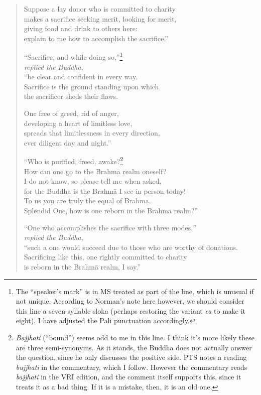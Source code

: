 \documentclass[12pt,openany]{book}%
\newcommand*{\scspeaker}[1]{\hspace{2em}\textit{#1}}
\begin{document}
\begin{verse}
Suppose a lay donor who is committed to charity \\
makes a sacrifice seeking merit, looking for merit, \\
giving food and drink to others here: \\
explain to me how to accomplish the sacrifice.” 

“Sacrifice, and while doing so,”\footnote{The “speaker’s mark” is in MS treated as part of the line, which is unusual if not unique. According to Norman’s note here however, we should consider this line a seven-syllable sloka (perhaps restoring the variant \textit{ca} to make it eight). I have adjusted the Pali punctuation accordingly. } \\
\scspeaker{replied the Buddha, }\\
“be clear and confident in every way. \\
Sacrifice is the ground standing upon which \\
the sacrificer sheds their flaws. 

One free of greed, rid of anger, \\
developing a heart of limitless love, \\
spreads that limitlessness in every direction, \\
ever diligent day and night.” 

“Who is purified, freed, awake?\footnote{\textit{Bajjhati} (“bound”) seems odd to me in this line. I think it’s more likely these are three semi-synonyms. As it stands, the Buddha does not actually answer the question, since he only discusses the positive side. PTS notes a reading \textit{bujjhati} in the commentary, which I follow. However the commentary reads \textit{bajjhati} in the VRI edition, and the comment itself supports this, since it treats it as a bad thing. If it is a mistake, then, it is an old one. } \\
How can one go to the \textsanskrit{Brahmā} realm oneself? \\
I do not know, so please tell me when asked, \\
for the Buddha is the \textsanskrit{Brahmā} I see in person today! \\
To us you are truly the equal of \textsanskrit{Brahmā}. \\
Splendid One, how is one reborn in the \textsanskrit{Brahmā} realm?” 

“One who accomplishes the sacrifice with three modes,” \\
\scspeaker{replied the Buddha, }\\
“such a one would succeed due to those who are worthy of donations. \\
Sacrificing like this, one rightly committed to charity \\
is reborn in the \textsanskrit{Brahmā} realm, I say.” 

%
\end{verse}
\end{document}
